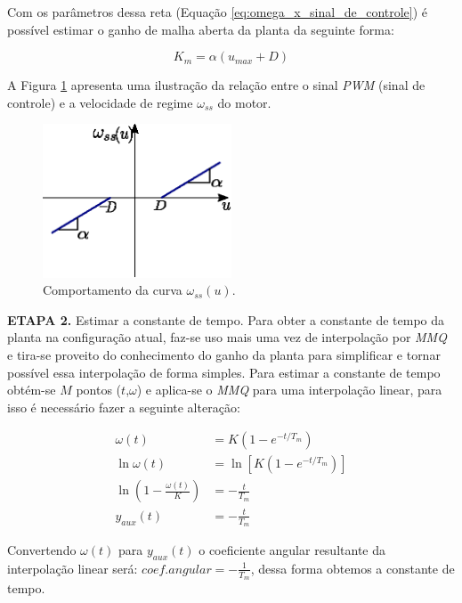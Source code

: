Com os parâmetros dessa reta (Equação \ref{eq:omega_x_sinal_de_controle}) é possível estimar o ganho de malha aberta da planta da seguinte forma:

\begin{equation}
    K_m = \alpha(u_{max} + D)
\end{equation}

A Figura \ref{fig:ilustracao_omega_x_pwm} apresenta uma ilustração da relação entre o sinal \emph{PWM} (sinal de controle) e a velocidade de regime $\omega_{ss}$ do motor.

\begin{figure}[H]
    \centering
    \includegraphics[width=0.5\textwidth]{figuras/ilustracoes/omega_x_sinal_controle.eps}
    \caption{Comportamento da curva $\omega_{ss}(u)$.}
    \label{fig:ilustracao_omega_x_pwm}
\end{figure}

    
\textbf{ETAPA 2.} Estimar a constante de tempo. Para obter a constante de tempo da planta na configuração atual, faz-se uso mais uma vez de interpolação por \textit{MMQ} e tira-se proveito do conhecimento do ganho da planta para simplificar e tornar possível essa interpolação de forma simples. Para estimar a constante de tempo obtém-se $M$ pontos ($t$,$\omega$) e aplica-se o \textit{MMQ} para uma interpolação linear, para isso é necessário fazer a seguinte alteração:
    

\begin{align*}
    \omega(t) &= K\left( 1 - e^{-t/T_m} \right)\\
    \ln{\omega(t)} &= \ln\left[K( 1 - e^{-t/T_m})\right]\\
    \ln\left(1 - \frac{\omega(t)}{K} \right) &= -\frac{t}{T_m}\\
    y_{aux}(t) &= -\frac{t}{T_m}
\end{align*}

Convertendo $\omega(t)$ para $y_{aux}(t)$ o coeficiente angular resultante da interpolação linear será: $coef.angular = -\frac{1}{T_m}$, dessa forma obtemos a constante de tempo.\\

